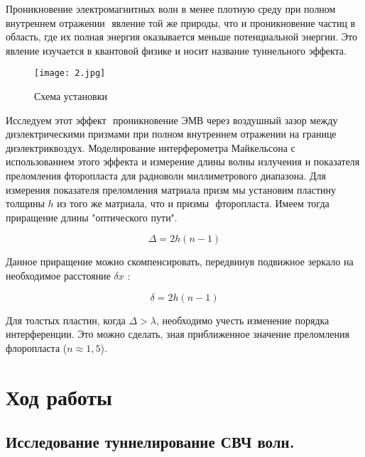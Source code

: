 \documentclass[a4paper]{article}
\begin{document}
Проникновение электромагнитных волн в менее плотную среду при полном внутреннем отражении ­ явление
той же природы, что и проникновение частиц в область, где их полная энергия оказывается меньше потенциальной энергии. Это явление изучается в квантовой физике и носит название туннельного эффекта.

    \begin{figure}[H]
		\begin{center}
		\label{graf_a}
		\texttt{[image: 2.jpg]}
		\caption{Схема установки}
		\end{center}
	\end{figure}

Исследуем этот эффект ­ проникновение ЭМВ через воздушный зазор между диэлектрическими призмами
при полном внутреннем отражении на границе диэлектрик­воздух. Моделирование интерферометра Майкельсона с использованием этого эффекта и измерение длины волны излучения и показателя преломления фторопласта
для радиоволн миллиметрового диапазона.
Для измерения показателя преломления матриала призм мы установим пластину толщины $h$ из того же матриала, что и призмы ­ фторопласта. Имеем тогда приращение длины "оптического пути".

\begin{equation}
    \varDelta = 2h(n - 1)
\end{equation}

Данное приращение можно скомпенсировать, передвинув подвижное зеркало на необходимое расстояние
$\delta x$ :

\begin{equation}
    \delta = 2h(n - 1)
\end{equation}

Для толстых пластин, когда $\varDelta > \lambda$, необходимо учесть изменение порядка интерференции. Это можно сделать, зная приближенное значение преломления флоропласта ($n \approx 1,5$).

\section{Ход работы}

\subsection{Исследование туннелирование СВЧ волн.}
\end{document}
